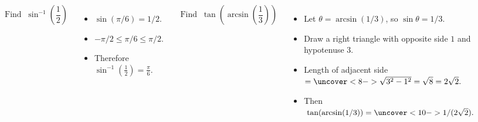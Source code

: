 \begin{frame}
\begin{example}[Example 1, p. 455]
\begin{columns}[t]
\[
\text{Find } \ \sin^{-1} \left( \frac{1}{2}\right) 
\]
\begin{itemize}
\item<2->  $\sin (\pi / 6) = 1/2$.
\item<3->  $-\pi /2 \leq \pi / 6 \leq \pi /2$.
\item<4->  Therefore $\sin^{-1} \left( \frac{1}{2}\right) = \frac{\pi}{6}$.
\end{itemize}
\[
\text{Find } \ \tan \left( \arcsin \left( \frac{1}{3}\right) \right)
\]
\begin{itemize}
\item<5->  Let $\theta = \arcsin (1/3)$, so $\sin \theta = 1/3$.
\item<6->  Draw a right triangle with opposite side $1$ and hypotenuse $3$.
\item<7->  \alert<handout:0| 7-8>{Length of adjacent side $ = \uncover<8->{\sqrt{3^2-1^2} = \sqrt{8} = 2\sqrt{2}.}$}
\item<9->  Then \alert<handout:0| 9-10>{$\tan (\arcsin (1/3)) = \uncover<10->{1/(2\sqrt{2}).}$}
\end{itemize}
\ %
%
%
\end{columns}
\end{example}
\end{frame}

